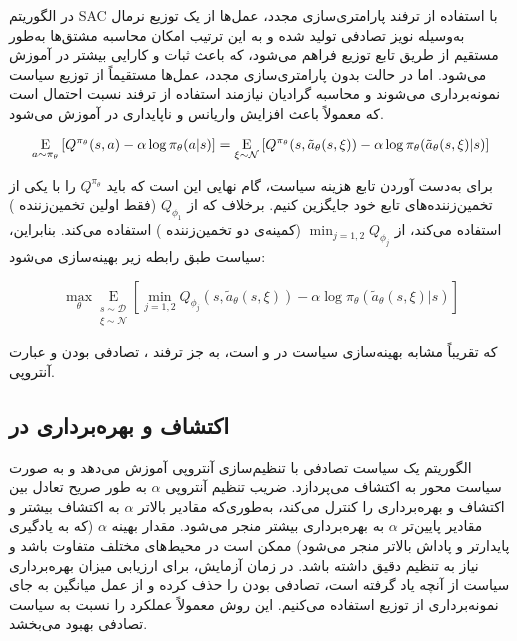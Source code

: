 در الگوریتم SAC با استفاده از ترفند پارامتری‌سازی مجدد، عمل‌ها از یک توزیع نرمال به‌وسیله نویز تصادفی تولید شده و به این ترتیب امکان محاسبه مشتق‌ها به‌طور مستقیم از طریق تابع توزیع فراهم می‌شود، که باعث ثبات و کارایی بیشتر در آموزش می‌شود. اما در حالت بدون پارامتری‌سازی مجدد، عمل‌ها مستقیماً از توزیع سیاست نمونه‌برداری می‌شوند و محاسبه گرادیان نیازمند استفاده از ترفند نسبت احتمال است که معمولاً باعث افزایش واریانس و ناپایداری در آموزش می‌شود.

\begin{equation}
	\underset{a \sim \pi_{\theta}}{\mathrm{E}}\left[
	{Q^{\pi_{\theta}}(s,a) - \alpha \log \pi_{\theta}(a|s)} 
	\right]= \underset{\xi \sim \mathcal{N}}{\mathrm{E}}\left[
	{Q^{\pi_{\theta}}(s,\tilde{a}_{\theta}(s,\xi)) - \alpha \log \pi_{\theta}(\tilde{a}_{\theta}(s,\xi)|s)}
	\right]
\end{equation}

برای به‌دست آوردن تابع هزینه سیاست، گام نهایی این است که باید \( Q^{\pi_{\theta}} \) را با یکی از تخمین‌زننده‌های تابع خود جایگزین کنیم. برخلاف  که از \( Q_{\phi_1} \) (فقط اولین تخمین‌زننده ) استفاده می‌کند،  از \( \min_{j=1,2} Q_{\phi_j} \) (کمینه‌ی دو تخمین‌زننده ) استفاده می‌کند. بنابراین، سیاست طبق رابطه زیر بهینه‌سازی می‌شود:


\begin{equation}
	\max_{\theta}
	\underset{\substack{s \sim \mathcal{D} \\ \xi \sim \mathcal{N}}}{\mathrm{E}} 
	\left[
	{\min_{j=1,2} Q_{\phi_j}(s,\tilde{a}_{\theta}(s,\xi)) - \alpha \log \pi_{\theta}(\tilde{a}_{\theta}(s,\xi)|s)}
	\right]
\end{equation}

که تقریباً مشابه بهینه‌سازی سیاست در  و  است، به جز ترفند ، تصادفی بودن و عبارت آنتروپی.

\subsection{اکتشاف و بهره‌برداری در }

الگوریتم  یک سیاست تصادفی با تنظیم‌سازی آنتروپی آموزش می‌دهد و به صورت سیاست محور به اکتشاف می‌پردازد. ضریب تنظیم آنتروپی \( \alpha \) به طور صریح تعادل بین اکتشاف و بهره‌برداری را کنترل می‌کند، به‌طوری‌که مقادیر بالاتر \( \alpha \) به اکتشاف بیشتر و مقادیر پایین‌تر \( \alpha \) به بهره‌برداری بیشتر منجر می‌شود. مقدار بهینه \( \alpha \) (که به یادگیری پایدارتر و پاداش بالاتر منجر می‌شود) ممکن است در محیط‌های مختلف متفاوت باشد و نیاز به تنظیم دقیق داشته باشد.
در زمان آزمایش، برای ارزیابی میزان بهره‌برداری سیاست از آنچه یاد گرفته است، تصادفی بودن را حذف کرده و از عمل میانگین به جای نمونه‌برداری از توزیع استفاده می‌کنیم. این روش معمولاً عملکرد را نسبت به سیاست تصادفی  بهبود می‌بخشد.



